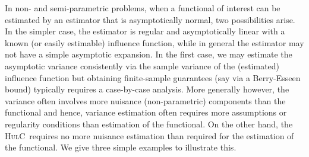 \documentclass{article}
\newcommand{\hulc}{\textsc{HulC}~}
\numberwithin{myalgctr}{section}
\begin{document}
In non- and semi-parametric problems, when a functional of interest can be estimated by an estimator that is asymptotically normal, two possibilities arise. In the simpler case, the estimator is regular and asymptotically linear with a known (or easily estimable) 
influence function, while in general the estimator may not have a simple asymptotic expansion. In the first case, we may estimate the asymptotic variance consistently via the sample variance of the (estimated) influence function but obtaining finite-sample guarantees (say via a Berry-Esseen bound) typically requires a case-by-case analysis. More generally however, 
the variance often involves more nuisance (non-parametric) components than the functional and hence, variance estimation often requires more assumptions or regularity conditions than estimation of the functional. 
On the other hand, the \hulc requires no more nuisance estimation than required for the estimation of the functional. We give three simple examples to illustrate this.
\end{document}
